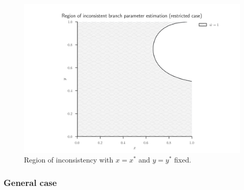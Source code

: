 \documentclass{article}
\begin{document}
\begin{figure}
\centering
\includegraphics[width=.9\textwidth]{branch-length-inconsistency-inkscape}
\caption{Region of inconsistency with $x=x^*$ and $y=y^*$ fixed.}
\label{fig:bl-inconsistency}
\end{figure}

\subsubsection*{General case}
\end{document}
